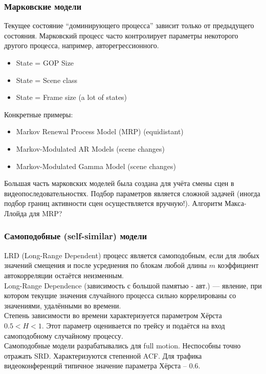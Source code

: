 \documentclass[10pt,pdf,hyperref={unicode}]{beamer}
\begin{document}
\begin{frame}
    \frametitle{Марковские модели}
    Текущее состояние ``доминирующего процесса'' зависит
    только от предыдущего состояния. Марковский процесс
    часто контролирует параметры некоторого другого процесса,
    например, авторегрессионного.
    \begin{itemize}
        \item State = GOP Size
        \item State = Scene class
        \item State = Frame size (a lot of states)
    \end{itemize}
    Конкретные примеры:
    \begin{itemize}
        \item Markov Renewal Process Model (MRP) (equidistant)
        \item Markov-Modulated AR Models (scene changes)
        \item Markov-Modulated Gamma Model (scene changes)
    \end{itemize}

    Большая часть марковских моделей была создана для учёта
    смены сцен в видеопоследовательностях. Подбор параметров
    является сложной задачей (иногда подбор границ активности
    сцен осуществляется вручную!). Алгоритм Макса-Ллойда для MRP?
\end{frame}

\begin{frame}
    \frametitle{Самоподобные (self-similar) модели}
    LRD (Long-Range Dependent) процесс является самоподобным,
    если для любых значений смещения и после усреднения по
    блокам любой длины $m$ коэффициент автокорреляции остаётся
    неизменным.\\[0.5 cm]

    Long-Range Dependence (зависимость с большой памятью - авт.) ---
    явление, при котором текущие значения случайного процесса
    сильно коррелированы со значениями, удалёнными во времени.\\[0.5 cm]

    Степень зависимости во времени характеризуется параметром
    Хёрста $0.5 < H < 1$. Этот параметр оценивается по трейсу и
    подаётся на вход самоподобному случайному процессу.\\[0.5 cm]

    Самоподобные модели разрабатывались для full motion.
    Неспособны точно отражать SRD. Характеризуются
    степенной ACF. Для трафика видеоконференций типичное
    значение параметра Хёрста -- $0.6$.
\end{frame}
\end{document}
